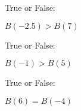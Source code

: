 \documentclass{ximera}
\begin{document}
\begin{exercise}
\begin{question} True or False:


$B(-2.5) > B(7)$

\begin{multipleChoice}
\end{multipleChoice}
\end{question} 






\begin{question} True or False:


$B(-1) > B(5)$

\begin{multipleChoice}
\end{multipleChoice}
\end{question} 








\begin{question} True or False:


$B(6) = B(-4)$

\begin{multipleChoice}
\end{multipleChoice}
\end{question} 






















\end{exercise}
\end{document}
